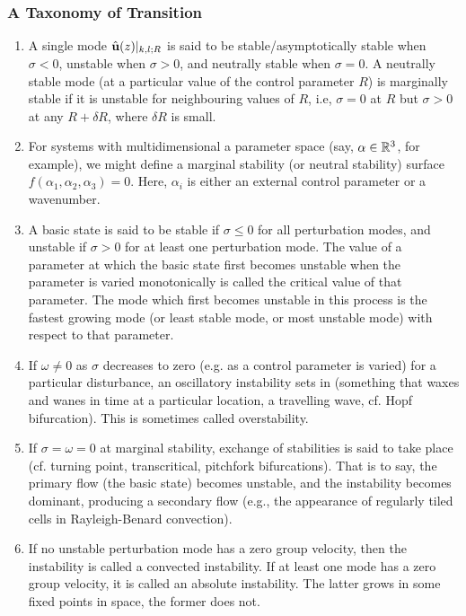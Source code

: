 \subsubsection{A Taxonomy of Transition}

\begin{enumerate}
    \item A single mode $\hat{{\textbf{u}}}(z)|_{k,l;R}$ is said to be stable/asymptotically stable when $\sigma < 0$, unstable when $\sigma > 0$, and neutrally stable when $\sigma = 0$. A neutrally stable mode (at a particular value of the control parameter $R$) is marginally stable if it is unstable for neighbouring values of $R$, i.e, $\sigma = 0$ at $R$ but $\sigma > 0$ at any $R + \delta R$, where $\delta R$ is small. 
    
    \item For systems with multidimensional a parameter space (say, $\alpha \in \mathbb{R}^3$, for example), we might define a marginal stability (or neutral stability) surface $f(\alpha_1, \alpha_2, \alpha_3) = 0$. Here, $\alpha_i$ is either an external control parameter or a wavenumber. 
    
    \item A basic state is said to be stable if $\sigma \leq 0$ for all perturbation modes, and unstable if $\sigma > 0$ for at least one perturbation mode. The value of a parameter at which the basic state first becomes unstable when the parameter is varied monotonically is called the critical value of that parameter. The mode which first becomes unstable in this process is the fastest growing mode (or least stable mode, or most unstable mode) with respect to that parameter. 
    
    \item If $\omega \neq 0$ as $\sigma$ decreases to zero (e.g. as a control parameter is varied) for a particular disturbance, an oscillatory instability sets in (something that waxes and wanes in time at a particular location, a travelling wave, cf. Hopf bifurcation). This is sometimes called overstability.
    
    \item If $\sigma = \omega = 0$ at marginal stability, exchange of stabilities is said to take place (cf. turning point, transcritical, pitchfork bifurcations). That is to say, the primary flow (the basic state) becomes unstable, and the instability becomes dominant, producing a secondary flow (e.g., the appearance of regularly tiled cells in Rayleigh-Benard convection). 
    
    \item If no unstable perturbation mode has a zero group velocity, then the instability is called a convected instability. If at least one mode has a zero group velocity, it is called an absolute instability. The latter grows in some fixed points in space, the former does not. 
\end{enumerate}

